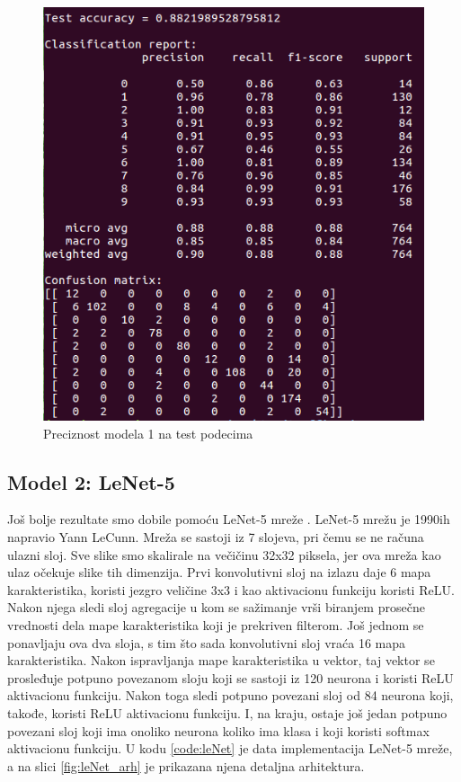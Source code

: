 \documentclass[a4paper]{article}
\begin{document}
\begin{figure}[h!]
\begin{center}
\includegraphics[scale=0.40]{model1_test_acc.png}
\end{center}
\caption{Preciznost modela 1 na test podecima}
\label{fig:model1_test_acc}
\end{figure}



\newpage

\subsection{Model 2:  LeNet-5}
\label{sec:model_2}


Još bolje rezultate smo dobile pomoću LeNet-5 mreže \cite{leNet}. LeNet-5 mrežu je 1990ih napravio Yann LeCunn. Mreža se sastoji iz 7 slojeva, pri čemu se ne računa ulazni sloj. Sve slike smo skalirale na večičinu 32x32 piksela, jer ova mreža kao ulaz očekuje slike tih dimenzija. Prvi konvolutivni sloj na izlazu daje 6 mapa karakteristika, koristi jezgro veličine 3x3 i kao aktivacionu funkciju koristi ReLU. Nakon njega sledi sloj agregacije u kom se sažimanje vrši biranjem prosečne vrednosti dela mape karakteristika koji je prekriven filterom. 
Još jednom se ponavljaju ova dva sloja, s tim što sada konvolutivni sloj vraća 16 mapa karakteristika. Nakon ispravljanja mape karakteristika u vektor, taj vektor se prosleđuje potpuno povezanom sloju koji se sastoji iz 120 neurona i koristi ReLU aktivacionu funkciju. Nakon toga sledi potpuno povezani sloj od 84 neurona koji, takođe, koristi ReLU aktivacionu funkciju. I, na kraju, ostaje još jedan potpuno povezani sloj koji ima onoliko neurona koliko ima klasa i koji koristi softmax aktivacionu funkciju. U kodu \ref{code:leNet} je data implementacija LeNet-5 mreže, a na slici \ref{fig:leNet_arh} je prikazana njena detaljna arhitektura.
\end{document}
